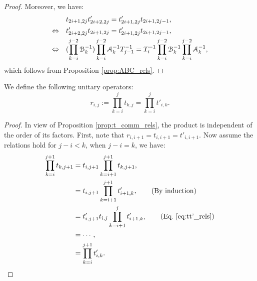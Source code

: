 \documentclass{amsart}
\begin{document}
\begin{proof}
Moreover, we have:
\[
\begin{aligned}
 &t_{2i+1,2j}t'_{2i+2,2j}=t'_{2i+1,2j}t_{2i+1,2j-1},\\
\Leftrightarrow\quad& t'_{2i+2,2j}t_{2i+1,2j}=t'_{2i+1,2j}t_{2i+1,2j-1},\\
\Leftrightarrow\quad& (\prod^{j-2}_{k=i}\mathcal{B}^{-1}_k)\prod^{j-2}_{k=i}\mathcal{A}^{-1}_k T^{-1}_{j-1}=T_i^{-1}\prod^{j-2}_{k=i}\mathcal{B}^{-1}_k\prod^{j-2}_{k=i}\mathcal{A}^{-1}_k,\\
\end{aligned}
\]   
which follows from Proposition \ref{prop:ABC_rels}.
\end{proof}


\begin{defn}
 We define the following unitary operators:
\[
 r_{i,j}:=\prod^{j}_{k=i}t_{k,j}=\prod^{j}_{k=i}t'_{i,k}.
\]
\end{defn}

\begin{proof}
In view of Proposition \ref{prop:t_comm_rels}, the product is independent of the order of its factors. First, note that $r_{i,i+1}=t_{i,i+1}=t'_{i,i+1}$. Now  
assume the relations hold for $j-i < k$, when $j-i=k$, we have: 
\[
\begin{aligned}
\prod^{j+1}_{k=i}t_{k,j+1}&=t_{i,j+1}\prod^{j+1}_{k=i+1}t_{k,j+1},\\
&=t_{i,j+1}\prod^{j+1}_{k=i+1}t'_{i+1,k}, \qquad (\text{By induction})\\
&=t'_{i,j+1}t_{i,j}\prod^{j}_{k=i+1}t'_{i+1,k},\qquad (\text{Eq.~\eqref{eq:tt'_rels}})\\
&=\cdots,\\
&=\prod^{j+1}_{k=i}t'_{i,k}.
\end{aligned}
\]
\end{proof}
\end{document}
